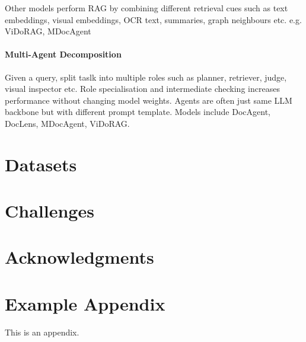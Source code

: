 \documentclass[11pt]{article}
\begin{document}
Other models perform RAG by combining different retrieval cues such as text embeddings, visual embeddings, OCR text, summaries, graph neighbours etc. e.g. ViDoRAG, MDocAgent

\paragraph{Multi-Agent Decomposition}
Given a query, split taslk into multiple roles such as planner, retriever, judge, visual inspector etc. Role specialisation and intermediate checking increases performance without changing model weights. Agents are often just same LLM backbone but with different prompt template. Models include DocAgent, DocLens, MDocAgent, ViDoRAG.

\section{Datasets}

\section{Challenges}

\section*{Acknowledgments}

%


\appendix

\section{Example Appendix}
\label{sec:appendix}

This is an appendix.
\end{document}
